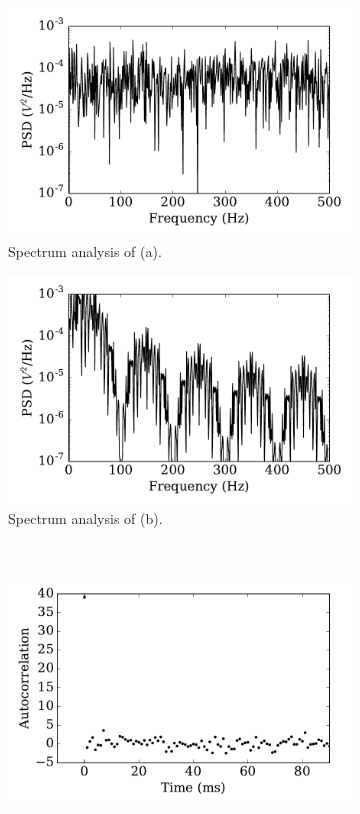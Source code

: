 \begin{figure}[tbp!]
\begin{subfigure}[t]{0.43\textwidth}
			\includegraphics[width=\textwidth]{pics_iconip/psd_dt1.pdf}
			\caption{Spectrum analysis of (a).}
		\end{subfigure}
		\begin{subfigure}[t]{0.43\textwidth}
			\includegraphics[width=\textwidth]{pics_iconip/psd_dt10.pdf}
			\caption{Spectrum analysis of (b).}
		\end{subfigure}\\
		\begin{subfigure}[t]{0.43\textwidth}
			\includegraphics[width=\textwidth]{pics_iconip/autocorr_dt1.pdf}

\end{subfigure}
\end{figure}
